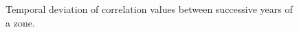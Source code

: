 \begin{figure}%
    \centering
    \qquad
    \caption{Temporal deviation of correlation values between successive years of a zone.}%
    \label{fig:samezonetimecomparision}%
\end{figure}